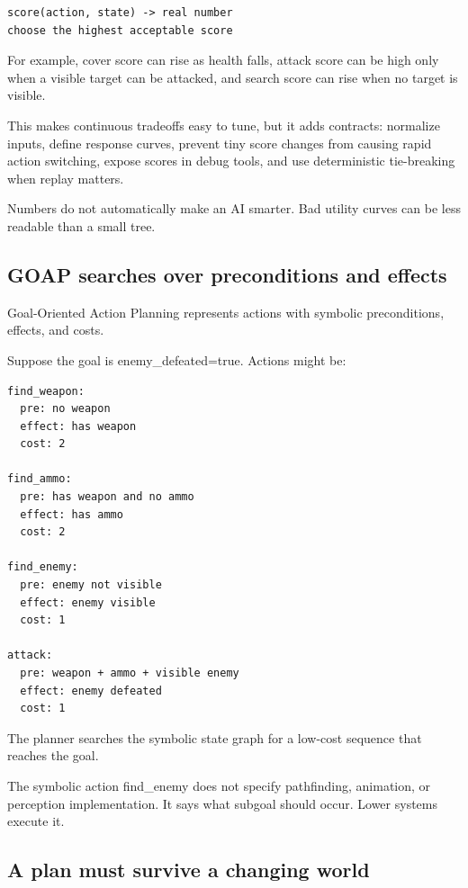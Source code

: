 \begin{verbatim}
score(action, state) -> real number
choose the highest acceptable score
\end{verbatim}

For example, cover score can rise as health falls, attack score can be high only when a visible target can be attacked, and search score can rise when no target is visible.

This makes continuous tradeoffs easy to tune, but it adds contracts: normalize inputs, define response curves, prevent tiny score changes from causing rapid action switching, expose scores in debug tools, and use deterministic tie-breaking when replay matters.

Numbers do not automatically make an AI smarter. Bad utility curves can be less readable than a small tree.

\subsection{GOAP searches over preconditions and effects}\label{06-engine-ii-ch047-goap-searches-over-preconditions-and-effects}

Goal-Oriented Action Planning represents actions with symbolic preconditions, effects, and costs.

Suppose the goal is enemy\_defeated=true. Actions might be:

\begin{verbatim}
find_weapon:
  pre: no weapon
  effect: has weapon
  cost: 2

find_ammo:
  pre: has weapon and no ammo
  effect: has ammo
  cost: 2

find_enemy:
  pre: enemy not visible
  effect: enemy visible
  cost: 1

attack:
  pre: weapon + ammo + visible enemy
  effect: enemy defeated
  cost: 1
\end{verbatim}

The planner searches the symbolic state graph for a low-cost sequence that reaches the goal.

The symbolic action find\_enemy does not specify pathfinding, animation, or perception implementation. It says what subgoal should occur. Lower systems execute it.

\subsection{A plan must survive a changing world}\label{06-engine-ii-ch047-a-plan-must-survive-a-changing-world}

